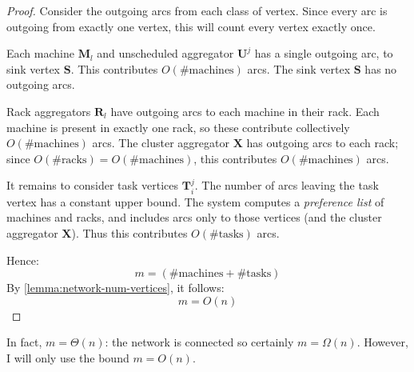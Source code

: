 \flowschedulingnumarcs*
\begin{proof}
Consider the outgoing arcs from each class of vertex. Since every arc is outgoing from exactly one vertex, this will count every vertex exactly once.

Each machine $\mathbf{M}_l$ and unscheduled aggregator $\mathbf{U}^j$ has a single outgoing arc, to sink vertex $\mathbf{S}$. This contributes $O\left(\text{\# machines}\right)$ arcs. The sink vertex $\mathbf{S}$ has no outgoing arcs.

Rack aggregators $\mathbf{R}_l$ have outgoing arcs to each machine in their rack. Each machine is present in exactly one rack, so these contribute collectively $O\left(\text{\# machines}\right)$ arcs. The cluster aggregator $\mathbf{X}$ has outgoing arcs to each rack; since $O\left(\text{\# racks}\right) = O\left(\text{\# machines}\right)$, this contributes $O\left(\text{\# machines}\right)$ arcs.

It remains to consider task vertices $\mathbf{T}_i^j$. The number of arcs leaving the task vertex has a constant upper bound. The system computes a \emph{preference list} of machines and racks, and includes arcs only to those vertices (and the cluster aggregator $\mathbf{X}$). Thus this contributes $O\left(\text{\# tasks}\right)$ arcs.

Hence:
\[m = \left(\text{\# machines} + \text{\# tasks}\right)\]
By \cref{lemma:network-num-vertices}, it follows:
\[m = O(n)\]
\end{proof}

\begin{remark}
In fact, $m = \Theta(n)$: the network is connected so certainly $m = \Omega(n)$. However, I will only use the bound $m = O(n)$.
\end{remark}